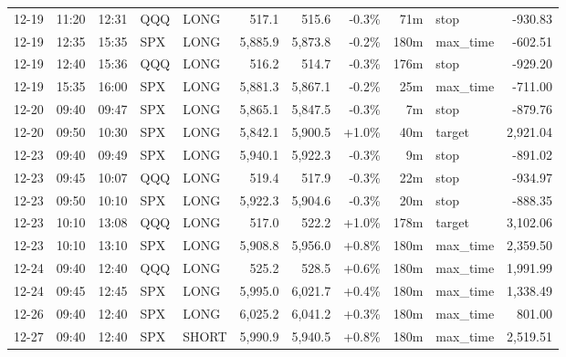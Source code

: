 \documentclass[11pt,a4paper,twoside]{article}
\begin{document}
\begin{center}
\begin{longtable}{>{\color{txtmain}}l l l l l r r r r >{\color{txtmain}}l r}
12-19 & 11:20 & 12:31 & QQQ & LONG & 517.1 & 515.6 & \textcolor{lossred}{-0.3\%} & 71m & stop & \textcolor{lossred}{-930.83} \\
12-19 & 12:35 & 15:35 & SPX & LONG & 5,885.9 & 5,873.8 & \textcolor{lossred}{-0.2\%} & 180m & max\_time & \textcolor{lossred}{-602.51} \\
12-19 & 12:40 & 15:36 & QQQ & LONG & 516.2 & 514.7 & \textcolor{lossred}{-0.3\%} & 176m & stop & \textcolor{lossred}{-929.20} \\
12-19 & 15:35 & 16:00 & SPX & LONG & 5,881.3 & 5,867.1 & \textcolor{lossred}{-0.2\%} & 25m & max\_time & \textcolor{lossred}{-711.00} \\
12-20 & 09:40 & 09:47 & SPX & LONG & 5,865.1 & 5,847.5 & \textcolor{lossred}{-0.3\%} & 7m & stop & \textcolor{lossred}{-879.76} \\
12-20 & 09:50 & 10:30 & SPX & LONG & 5,842.1 & 5,900.5 & \textcolor{wingreen}{+1.0\%} & 40m & target & \textcolor{wingreen}{2,921.04} \\
12-23 & 09:40 & 09:49 & SPX & LONG & 5,940.1 & 5,922.3 & \textcolor{lossred}{-0.3\%} & 9m & stop & \textcolor{lossred}{-891.02} \\
12-23 & 09:45 & 10:07 & QQQ & LONG & 519.4 & 517.9 & \textcolor{lossred}{-0.3\%} & 22m & stop & \textcolor{lossred}{-934.97} \\
12-23 & 09:50 & 10:10 & SPX & LONG & 5,922.3 & 5,904.6 & \textcolor{lossred}{-0.3\%} & 20m & stop & \textcolor{lossred}{-888.35} \\
12-23 & 10:10 & 13:08 & QQQ & LONG & 517.0 & 522.2 & \textcolor{wingreen}{+1.0\%} & 178m & target & \textcolor{wingreen}{3,102.06} \\
12-23 & 10:10 & 13:10 & SPX & LONG & 5,908.8 & 5,956.0 & \textcolor{wingreen}{+0.8\%} & 180m & max\_time & \textcolor{wingreen}{2,359.50} \\
12-24 & 09:40 & 12:40 & QQQ & LONG & 525.2 & 528.5 & \textcolor{wingreen}{+0.6\%} & 180m & max\_time & \textcolor{wingreen}{1,991.99} \\
12-24 & 09:45 & 12:45 & SPX & LONG & 5,995.0 & 6,021.7 & \textcolor{wingreen}{+0.4\%} & 180m & max\_time & \textcolor{wingreen}{1,338.49} \\
12-26 & 09:40 & 12:40 & SPX & LONG & 6,025.2 & 6,041.2 & \textcolor{wingreen}{+0.3\%} & 180m & max\_time & \textcolor{wingreen}{801.00} \\
12-27 & 09:40 & 12:40 & SPX & SHORT & 5,990.9 & 5,940.5 & \textcolor{wingreen}{+0.8\%} & 180m & max\_time & \textcolor{wingreen}{2,519.51} \\

\end{longtable}
\end{center}
\end{document}
